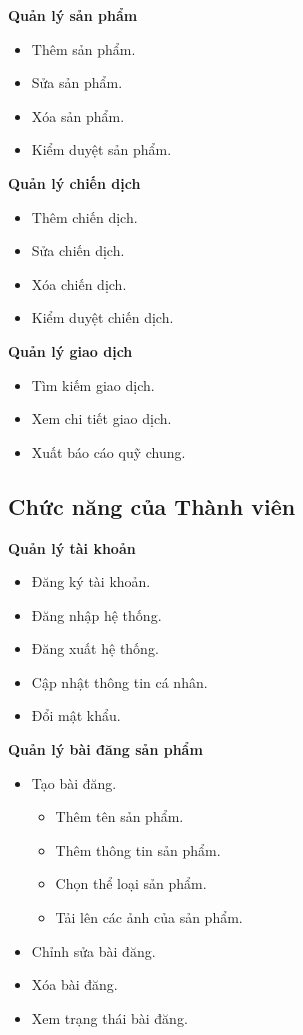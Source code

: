 \documentclass[12pt,a4paper]{report}
\begin{document}
\textbf{Quản lý sản phẩm}
\begin{itemize}[label=--, leftmargin=1.2cm]
\item Thêm sản phẩm.
\item Sửa sản phẩm.
\item Xóa sản phẩm.
\item Kiểm duyệt sản phẩm.
\end{itemize}

\textbf{Quản lý chiến dịch}
\begin{itemize}[label=--, leftmargin=1.2cm]
\item Thêm chiến dịch.
\item Sửa chiến dịch.
\item Xóa chiến dịch.
\item Kiểm duyệt chiến dịch.
\end{itemize}

\textbf{Quản lý giao dịch}
\begin{itemize}[label=--, leftmargin=1.2cm]
\item Tìm kiếm giao dịch.
\item Xem chi tiết giao dịch.
\item Xuất báo cáo quỹ chung.
\end{itemize}

\subsection{Chức năng của Thành viên}

\textbf{Quản lý tài khoản}
\begin{itemize}[label=--, leftmargin=1.2cm]
\item Đăng ký tài khoản.
\item Đăng nhập hệ thống.
\item Đăng xuất hệ thống.
\item Cập nhật thông tin cá nhân.
\item Đổi mật khẩu.
\end{itemize}

\textbf{Quản lý bài đăng sản phẩm}
\begin{itemize}[label=--, leftmargin=1.2cm]
\item Tạo bài đăng.
\begin{itemize}[label=+, leftmargin=1.5cm]
\item Thêm tên sản phẩm.
\item Thêm thông tin sản phẩm.
\item Chọn thể loại sản phẩm.
\item Tải lên các ảnh của sản phẩm.
\end{itemize}
\item Chỉnh sửa bài đăng.
\item Xóa bài đăng.
\item Xem trạng thái bài đăng.
\end{itemize}
\end{document}
